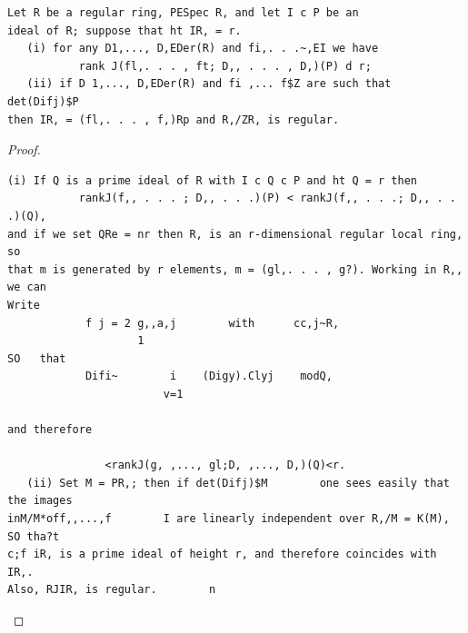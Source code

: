 \begin{theorem}\label{mcrt-auto-theorem-30-4}\uses{}
\begin{verbatim}
Let R be a regular ring, PESpec R, and let I c P be an
ideal of R; suppose that ht IR, = r.
   (i) for any D1,..., D,EDer(R) and fi,. . .~,EI we have
           rank J(fl,. . . , ft; D,, . . . , D,)(P) d r;
   (ii) if D 1,..., D,EDer(R) and fi ,... f$Z are such that det(Difj)$P
then IR, = (fl,. . . , f,)Rp and R,/ZR, is regular.
\end{verbatim}
\end{theorem}
\begin{proof}
\begin{verbatim}
(i) If Q is a prime ideal of R with I c Q c P and ht Q = r then
           rankJ(f,, . . . ; D,, . . .)(P) < rankJ(f,, . . .; D,, . . .)(Q),
and if we set QRe = nr then R, is an r-dimensional regular local ring, so
that m is generated by r elements, m = (gl,. . . , g?). Working in R,, we can
Write
            f j = 2 g,,a,j        with      cc,j~R,
                    1
SO   that
            Difi~        i    (Digy).Clyj    modQ,
                        v=1

and therefore

               <rankJ(g, ,..., gl;D, ,..., D,)(Q)<r.
   (ii) Set M = PR,; then if det(Difj)$M        one sees easily that the images
inM/M*off,,...,f        I are linearly independent over R,/M = K(M), SO tha?t
c;f iR, is a prime ideal of height r, and therefore coincides with IR,.
Also, RJIR, is regular.        n
\end{verbatim}
\end{proof}


